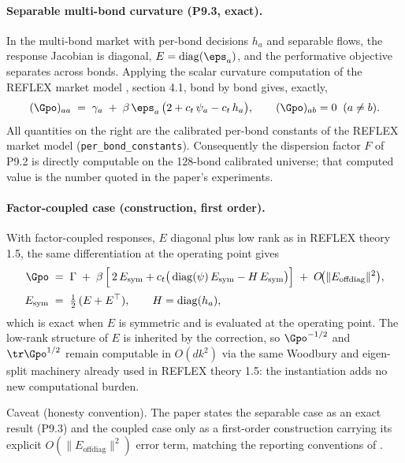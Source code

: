 \paragraph{Separable multi-bond curvature (P9.3, exact).}
In the multi-bond market with per-bond decisions $h_a$ and separable
flows, the response Jacobian is diagonal,
$E = \operatorname{diag}(\eps_a)$, and the performative objective
separates across bonds. Applying the scalar curvature computation of
the REFLEX market model \citep{reflex2026}, section 4.1, bond by bond gives, exactly,
\begin{equation*}
(\Gpo)_{aa} \;=\; \gamma_a \;+\; \beta\,\eps_a\,
\big( 2 + c_t\,\psi_a - c_t\,h_a \big),
\qquad (\Gpo)_{ab} = 0 \;\; (a \ne b).
\end{equation*}
All quantities on the right are the calibrated per-bond constants of
the REFLEX market model \citep{reflex2026} (\texttt{per\_bond\_constants}). Consequently the
dispersion factor $F$ of P9.2 is directly computable on the 128-bond
calibrated universe; that computed value is the number quoted in the
paper's experiments.

\paragraph{Factor-coupled case (construction, first order).}
With factor-coupled responses, $E$ diagonal plus low rank as in REFLEX
theory 1.5, the same differentiation at the operating point gives
\begin{equation*}
\begin{aligned}
\Gpo \;&=\; \Gamma \;+\; \beta\,\Big[\, 2\,E_{\mathrm{sym}}
+ c_t\big( \operatorname{diag}(\psi)\,E_{\mathrm{sym}}
- H\,E_{\mathrm{sym}} \big) \Big]
\;+\; O\!\big(\|E_{\mathrm{offdiag}}\|^2\big), \\[2pt]
E_{\mathrm{sym}} \;&=\; \tfrac{1}{2}\,(E + E^{\top}), \qquad
H = \operatorname{diag}(h_a),
\end{aligned}
\end{equation*}
which is exact when $E$ is symmetric and is evaluated at the operating
point. The low-rank structure of $E$ is inherited by the correction, so
$\Gpo^{-1/2}$ and $\tr \Gpo^{1/2}$ remain computable in $O(d k^2)$ via
the same Woodbury and eigen-split machinery already used in REFLEX
theory 1.5: the instantiation adds no new computational burden.

Caveat (honesty convention). The paper states the separable case as an
exact result (P9.3) and the coupled case only as a first-order
construction carrying its explicit $O(\|E_{\mathrm{offdiag}}\|^2)$ error
term, matching the reporting conventions of \citet{reflex2026}.

